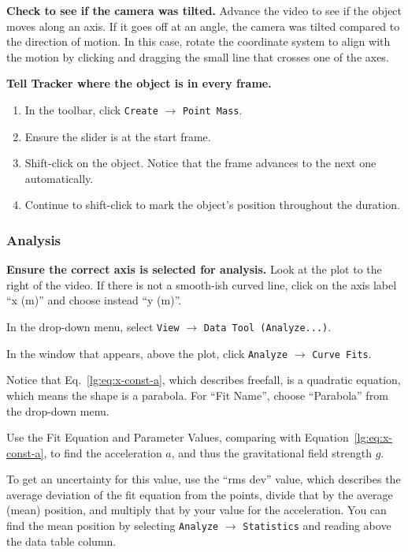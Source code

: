 \begin{steps}
	\item \textbf{Check to see if the camera was tilted.} Advance the video to see if the object moves along an axis. If it goes off at an angle, the camera was tilted compared to the direction of motion. In this case, rotate the coordinate system to align with the motion by clicking and dragging the small line that crosses one of the axes.
	
	\item \textbf{Tell Tracker where the object is in every frame.}
	\begin{enumerate}
		\item In the toolbar, click \texttt{Create} $\rightarrow$ \texttt{Point Mass}.
		\item Ensure the slider is at the start frame.
		\item Shift-click on the object. Notice that the frame advances to the next one automatically.
		\item Continue to shift-click to mark the object's position throughout the duration.
	\end{enumerate}
\end{steps}

\subsubsection{Analysis}

\begin{steps}
	\item \textbf{Ensure the correct axis is selected for analysis.} Look at the plot to the right of the video. If there is not a smooth-ish curved line, click on the axis label ``x (m)'' and choose instead ``y (m)''.
	
	\item In the drop-down menu, select \texttt{View} $\rightarrow$ \texttt{Data Tool (Analyze...)}.
	
	\item In the window that appears, above the plot, click \texttt{Analyze} $\rightarrow$ \texttt{Curve Fits}.
	
	\item Notice that Eq.~\ref{lg:eq:x-const-a}, which describes freefall, is a quadratic equation, which means the shape is a parabola. For ``Fit Name'', choose ``Parabola'' from the drop-down menu.
	
	\item Use the Fit Equation and Parameter Values, comparing with Equation~\ref{lg:eq:x-const-a}, to find the acceleration $a$, and thus the gravitational field strength $g$.
	
	\item To get an uncertainty for this value, use the ``rms dev'' value, which describes the average deviation of the fit equation from the points, divide that by the average (mean) position, and multiply that by your value for the acceleration. You can find the mean position by selecting \texttt{Analyze} $\rightarrow$ \texttt{Statistics} and reading above the data table column.
\end{steps}

